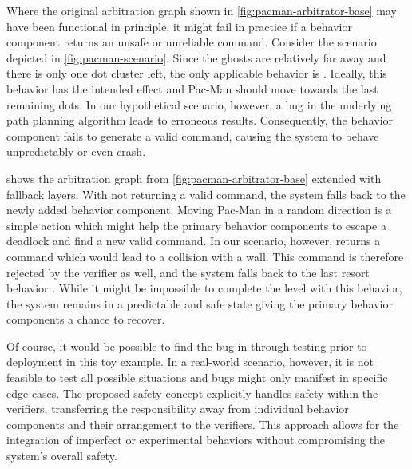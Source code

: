 Where the original arbitration graph shown in \cref{fig:pacman-arbitrator-base} may have been functional in principle, it might fail in practice if a behavior component returns an unsafe or unreliable command.
Consider the scenario depicted in \cref{fig:pacman-scenario}.
Since the ghosts are relatively far away and there is only one dot cluster left, the only applicable behavior is .
Ideally, this behavior has the intended effect and Pac-Man should move towards the last remaining dots.
In our hypothetical scenario, however, a bug in the underlying path planning algorithm leads to erroneous results.
Consequently, the behavior component fails to generate a valid command, causing the system to behave unpredictably or even crash.

 shows the arbitration graph from \cref{fig:pacman-arbitrator-base} extended with fallback layers.
With  not returning a valid command, the system falls back to the newly added  behavior component.
Moving Pac-Man in a random direction is a simple action which might help the primary behavior components to escape a deadlock and find a new valid command.
In our scenario, however,  returns a command which would lead to a collision with a wall.
This command is therefore rejected by the verifier as well, and the system falls back to the last resort behavior .
While it might be impossible to complete the level with this behavior, the system remains in a predictable and safe state giving the primary behavior components a chance to recover.

Of course, it would be possible to find the bug in  through testing prior to deployment in this toy example.
In a real-world scenario, however, it is not feasible to test all possible situations and bugs might only manifest in specific edge cases.
The proposed safety concept explicitly handles safety within the verifiers, transferring the responsibility away from individual behavior components and their arrangement to the verifiers.
This approach allows for the integration of imperfect or experimental behaviors without compromising the system's overall safety.

